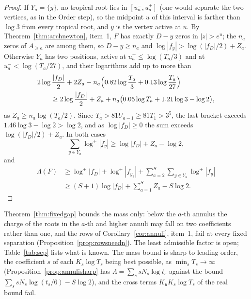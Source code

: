 \documentclass[11pt]{article}
\begin{document}
\begin{proof}
If $Y_a=\{y\}$, no tropical root lies in $[u_a^-,u_a^+]$ (one would separate
the two vertices, as in the Order step), so the midpoint $u$
of this interval is farther than $\log3$ from every tropical root, and $y$ is
the vertex active at $u$.  By Theorem~\ref{thm:archnewton}, item~1, $F$ has
exactly $D-y$ zeros in $|z|>e^u$; the $n_a$ zeros of $A_{\ge a}$ are among
them, so $D-y\ge n_a$ and $\log|f_y|>\log(|f_D|/2)+Z_a$.  Otherwise $Y_a$
has two positions, active at $u_a^+\le\log(T_a/3)$ and at
$u_a^-<\log(T_a/27)$, and their logarithms add up to more than
\[
  \begin{aligned}
  &2\log\frac{|f_D|}2+2Z_a
    -n_a\Bigl(0.82\log\frac{T_a}3+0.13\log\frac{T_a}{27}\Bigr)\\
  &\qquad\ge 2\log\frac{|f_D|}2+Z_a
    +n_a\bigl(0.05\log T_a+1.21\log3-\log2\bigr),
  \end{aligned}
\]
as $Z_a\ge n_a\log(T_a/2)$.  Since $T_a>81U_{a-1}\ge81T_1>3^5$, the last
bracket exceeds $1.46\log3-\log2>\log2$, and as $\log|f_D|\ge0$ the sum
exceeds $\log(|f_D|/2)+Z_a$.  In both cases
\[
  \sum_{y\in Y_a}\log^+|f_y|\ge\log|f_D|+Z_a-\log2,
\]
and
\[
  \begin{aligned}
  \Lambda(F)&\ge \log^+|f_D|+\log^+|f_{y_1}|
    +\sum_{a=2}^S\sum_{y\in Y_a}\log^+|f_y|\\
  &\ge (S+1)\log|f_D|+\sum_{a=1}^SZ_a-S\log2 .
  \end{aligned}
\]
\end{proof}

Theorem~\ref{thm:fixedgap} bounds the mass only: below the $a$-th annulus
the charge of the roots in the $a$-th and higher annuli may fall on two
coefficients rather than one, and the rows of Corollary~\ref{cor:annuli},
item~1, fail at every fixed separation (Proposition~\ref{prop:rowsneedn}).
The least admissible factor is open; Table~\ref{tab:sep} lists what is
known.  The mass bound is sharp to leading order, the
coefficient $s$ of each $K_s\log T_s$ being best possible, as
$\min_sT_s\to\infty$ (Proposition~\ref{prop:annulisharp} has
$\Lambda=\sum_ssN_s\log t_s$ against the bound
$\sum_ssN_s\log(t_s/6)-S\log2$), and the cross terms $K_uK_s\log T_s$ of the
real bound fail.
\end{document}
